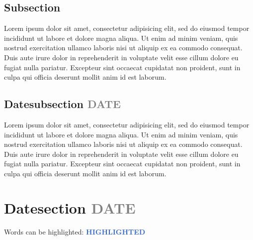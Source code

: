 \documentclass[a4paper, 11pt]{article}
\newcommand\datesection[2]{\section{#1 \hfill \fontsize{11pt}{11pt}\selectfont \normalfont \textcolor{gray}{#2}}}
\newcommand\datesubsection[2]{\subsection{#1 \hfill \fontsize{11pt}{11pt}\selectfont \normalfont \textcolor{gray}{#2}}}
\newcommand{\hl}[1]{\textbf{\textcolor{highlight}{#1}}}
\begin{document}
	\subsection{Subsection}

	Lorem ipsum dolor sit amet, consectetur adipisicing elit, sed do eiusmod tempor incididunt ut labore et dolore magna aliqua. Ut enim ad minim veniam, quis nostrud exercitation ullamco laboris nisi ut aliquip ex ea commodo consequat. Duis aute irure dolor in reprehenderit in voluptate velit esse cillum dolore eu fugiat nulla pariatur. Excepteur sint occaecat cupidatat non proident, sunt in culpa qui officia deserunt mollit anim id est laborum.

	\datesubsection{Datesubsection}{DATE}

	Lorem ipsum dolor sit amet, consectetur adipisicing elit, sed do eiusmod tempor incididunt ut labore et dolore magna aliqua. Ut enim ad minim veniam, quis nostrud exercitation ullamco laboris nisi ut aliquip ex ea commodo consequat. Duis aute irure dolor in reprehenderit in voluptate velit esse cillum dolore eu fugiat nulla pariatur. Excepteur sint occaecat cupidatat non proident, sunt in culpa qui officia deserunt mollit anim id est laborum.

	\datesection{Datesection}{DATE}

	Words can be highlighted: \hl{HIGHLIGHTED}





\end{document}
